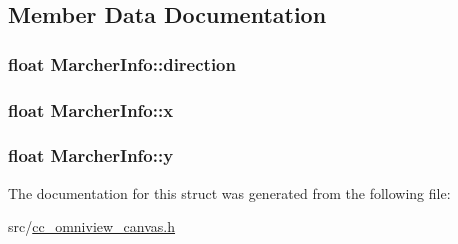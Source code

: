 \subsection{Member Data Documentation}
\hypertarget{a00110_a7e816624b871bbd1763877488ca0a01b}{
\subsubsection[{direction}]{\setlength{\rightskip}{0pt plus 5cm}float Marcher\-Info\-::direction}}\label{a00110_a7e816624b871bbd1763877488ca0a01b}
\hypertarget{a00110_ac84cdd3c3bd8586829e9fd4e310cda66}{
\subsubsection[{x}]{\setlength{\rightskip}{0pt plus 5cm}float Marcher\-Info\-::x}}\label{a00110_ac84cdd3c3bd8586829e9fd4e310cda66}
\hypertarget{a00110_a5bc5aa8d9e9f4e2788e900fcec1f8414}{
\subsubsection[{y}]{\setlength{\rightskip}{0pt plus 5cm}float Marcher\-Info\-::y}}\label{a00110_a5bc5aa8d9e9f4e2788e900fcec1f8414}


The documentation for this struct was generated from the following file\-:\begin{DoxyCompactItemize}
\item 
src/\hyperlink{a00185}{cc\-\_\-omniview\-\_\-canvas.\-h}\end{DoxyCompactItemize}
